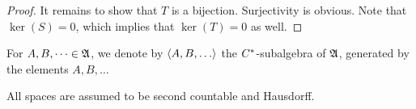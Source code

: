 \begin{proof}
 It remains to show that $T$ is a bijection.
 Surjectivity is obvious. Note that $\ker(S) =0$, which implies that 
 $\ker(T)=0$ as well.
 \end{proof}

For $A, B, \dots \in \mathfrak{A}$, we denote by $\gen{A, B, \dots}$ the
$C^{*}$-subalgebra of $\mathfrak{A}$, generated by the elements $A, B, \dots$

All spaces are assumed to be second countable and Hausdorff. 



% 
% 

 
















